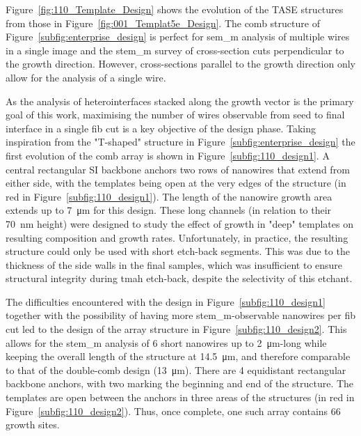Figure~\ref{fig:110_Template_Design} shows the evolution of the \acs{TASE} structures from those in Figure~\ref{fig:001_Templat5e_Design}. The comb structure of Figure~\ref{subfig:enterprise_design} is perfect for \acf{sem_m} analysis of multiple wires in a single image and the \acf{stem_m} survey of cross-section cuts perpendicular to the growth direction. However, cross-sections parallel to the growth direction only allow for the analysis of a single wire.
\par
As the analysis of heterointerfaces stacked along the growth vector is the primary goal of this work, maximising the number of wires observable from seed to final interface in a single \acf{fib} cut is a key objective of the design phase. Taking inspiration from the "T-shaped" structure in Figure~\ref{subfig:enterprise_design} the first evolution of the comb array is shown in Figure~\ref{subfig:110_design1}. A central rectangular \acl{SI} backbone anchors two rows of nanowires that extend from either side, with the templates being open at the very edges of the structure (in red in Figure~\ref{subfig:110_design1}). The length of the nanowire growth area extends up to \qty{7}{\micro\metre} for this design. These long channels (in relation to their \qty{70}{\nano\metre} height) were designed to study the effect of growth in "deep" templates on resulting composition and growth rates. Unfortunately, in practice, the resulting structure could only be used with short etch-back segments. This was due to the thickness of the side walls in the final samples, which was insufficient to ensure structural integrity during \acs{tmah} etch-back, despite the selectivity of this etchant.
\par
The difficulties encountered with the design in Figure~\ref{subfig:110_design1} together with the possibility of having more \acs{stem_m}-observable nanowires per \acs{fib} cut led to the design of the array structure in Figure~\ref{subfig:110_design2}. This allows for the \acs{stem_m} analysis of \num{6} short nanowires up to \qty{2}{\micro\metre}-long while keeping the overall length of the structure at \qty{14.5}{\micro\metre}, and therefore comparable to that of the double-comb design (\qty{13}{\micro\metre}). There are \num{4} equidistant rectangular backbone anchors, with two marking the beginning and end of the structure. The templates are open between the anchors in three areas of the structures (in red in Figure~\ref{subfig:110_design2}). Thus, once complete, one such array contains \num{66} growth sites.

